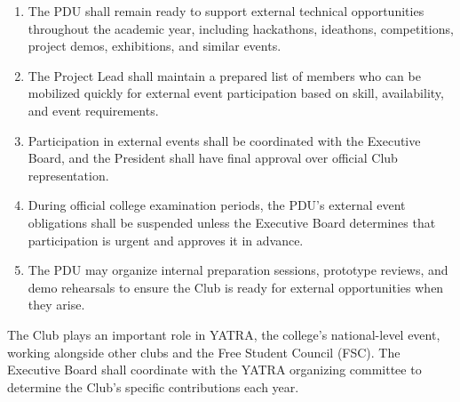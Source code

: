 
\begin{enumerate}[label=\alph*), leftmargin=2em, itemsep=0.3em]
    \item The PDU shall remain ready to support external technical opportunities throughout the academic year, including hackathons, ideathons, competitions, project demos, exhibitions, and similar events.
    \item The Project Lead shall maintain a prepared list of members who can be mobilized quickly for external event participation based on skill, availability, and event requirements.
    \item Participation in external events shall be coordinated with the Executive Board, and the President shall have final approval over official Club representation.
    \item During official college examination periods, the PDU's external event obligations shall be suspended unless the Executive Board determines that participation is urgent and approves it in advance.
    \item The PDU may organize internal preparation sessions, prototype reviews, and demo rehearsals to ensure the Club is ready for external opportunities when they arise.
\end{enumerate}


The Club plays an important role in YATRA, the college's national-level event, working alongside other clubs and the Free Student Council (FSC). The Executive Board shall coordinate with the YATRA organizing committee to determine the Club's specific contributions each year.
